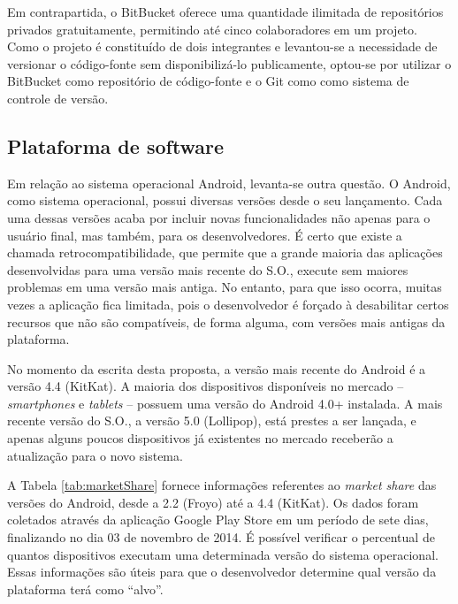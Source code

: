 Em contrapartida, o BitBucket oferece uma quantidade ilimitada de repositórios privados gratuitamente, permitindo até cinco colaboradores em um projeto. Como o projeto é constituído de dois integrantes e levantou-se a necessidade de versionar o código-fonte sem disponibilizá-lo publicamente, optou-se por utilizar o BitBucket como repositório de código-fonte e o Git como como sistema de controle de versão.

\subsection{Plataforma de software}

Em relação ao sistema operacional Android, levanta-se outra questão. O Android, como sistema operacional, possui diversas versões desde o seu lançamento. Cada uma dessas versões acaba por incluir novas funcionalidades não apenas para o usuário final, mas também, para os desenvolvedores. É certo que existe a chamada retrocompatibilidade, que permite que a grande maioria das aplicações desenvolvidas para uma versão mais recente do S.O., execute sem maiores problemas em uma versão mais antiga. No entanto, para que isso ocorra, muitas vezes a aplicação fica limitada, pois o desenvolvedor é forçado à desabilitar certos recursos que não são compatíveis, de forma alguma, com versões mais antigas da plataforma.

No momento da escrita desta proposta, a versão mais recente do Android é a versão 4.4 (KitKat). A maioria dos dispositivos disponíveis no mercado -- \emph{smartphones} e \emph{tablets} -- possuem uma versão do Android 4.0+ instalada. A mais recente versão do S.O., a versão 5.0 (Lollipop), está prestes a ser lançada, e apenas alguns poucos dispositivos já existentes no mercado receberão a atualização para o novo sistema.

A Tabela \ref{tab:marketShare} fornece informações referentes ao \emph{market share} das versões do Android, desde a 2.2 (Froyo) até a 4.4 (KitKat). Os dados foram coletados através da aplicação Google Play Store em um período de sete dias, finalizando no dia 03 de novembro de 2014. É possível verificar o percentual de quantos dispositivos executam uma determinada versão do sistema operacional. Essas informações são úteis para que o desenvolvedor determine qual versão da plataforma terá como ``alvo''.

